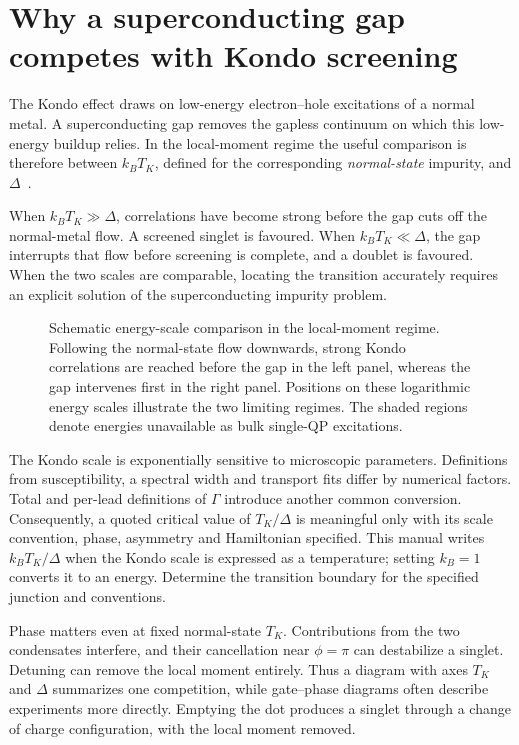\section{Why a superconducting gap competes with Kondo screening}

The Kondo effect draws on low-energy electron--hole excitations of a normal
metal. A superconducting gap removes the gapless continuum on which this
low-energy buildup relies. In the local-moment regime the useful comparison is
therefore between $k_BT_K$, defined for the corresponding \emph{normal-state}
impurity, and $\Delta$~\cite{choi2004kondo,siano2004josephson,bauer2007spectral}.

When $k_BT_K\gg\Delta$, correlations have become strong before the gap cuts off
the normal-metal flow. A screened singlet is favoured. When $k_BT_K\ll\Delta$,
the gap interrupts that flow before screening is complete, and a doublet is
favoured. When the two scales are comparable, locating the transition accurately
requires an explicit solution of the superconducting impurity problem.

\begin{figure}[htb]
\centering{}
\caption{Schematic energy-scale comparison in the local-moment regime. Following
the normal-state flow downwards, strong Kondo correlations are reached before the
gap in the left panel, whereas the gap intervenes first in the right panel.
Positions on these logarithmic energy scales illustrate the two limiting regimes.
The shaded regions denote energies unavailable as bulk single-QP
excitations.}
\label{fig:primer-scales}
\end{figure}

The Kondo scale is exponentially sensitive to microscopic parameters. Definitions
from susceptibility, a spectral width and transport fits differ by numerical
factors. Total and per-lead definitions of $\Gamma$ introduce another common
conversion. Consequently, a quoted critical value of $T_K/\Delta$ is meaningful
only with its scale convention, phase, asymmetry and Hamiltonian specified. This
manual writes $k_BT_K/\Delta$ when the Kondo scale is expressed as a temperature; setting $k_B=1$
converts it to an energy. Determine the transition boundary for the specified
junction and conventions.

Phase matters even at fixed normal-state $T_K$. Contributions from the two
condensates interfere, and their cancellation near $\phi=\pi$ can destabilize a
singlet. Detuning can remove the local moment entirely. Thus a diagram with axes
$T_K$ and $\Delta$ summarizes one competition, while gate--phase diagrams often
describe experiments more directly. Emptying the dot produces a singlet through
a change of charge configuration, with the local moment removed.

